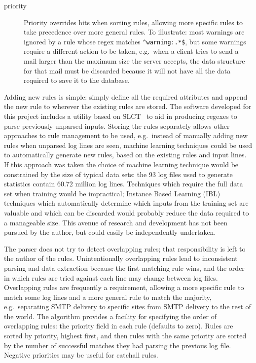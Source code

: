 \documentclass[draft]{svmult}
\newcommand{\numberOFlogFILES}[0]{%
    93%
}
\newcommand{\numberOFlogLINEShuman}[0]{%
    60.72 million%
}
\begin{document}
\begin{description}
    \item [priority] Priority overrides hits when sorting rules, allowing
        more specific rules to take precedence over more general rules.  To
        illustrate: most warnings are ignored by a rule whose regex matches
        \verb!^warning:.*$!, but some warnings require a different action
        to be taken, e.g.\ when a client tries to send a mail larger than
        the maximum size the server accepts, the data structure for that
        mail must be discarded because it will not have all the data
        required to save it to the database.

\end{description}

Adding new rules is simple: simply define all the required attributes and
append the new rule to wherever the existing rules are stored.  The
software developed for this project includes a utility based on
SLCT~\cite{slct-paper} to aid in producing regexes to parse previously
unparsed inputs.  Storing the rules separately allows other approaches to
rule management to be used, e.g.\ instead of manually adding new rules when
unparsed log lines are seen, machine learning techniques could be used to
automatically generate new rules, based on the existing rules and input
lines.  If this approach was taken the choice of machine learning technique
would be constrained by the size of typical data sets: the
\numberOFlogFILES{} log files used to generate statistics contain
\numberOFlogLINEShuman{} log lines.  Techniques which require the full data
set when training would be impractical; Instance Based Learning
(IBL)~\cite{instance-based-learning} techniques which automatically
determine which inputs from the training set are valuable and which can be
discarded would probably reduce the data required to a manageable size.
This avenue of research and development has not been pursued by the author,
but could easily be independently undertaken.

\label{overlapping rules}

The parser does not try to detect overlapping rules; that responsibility is
left to the author of the rules.  Unintentionally overlapping rules lead to
inconsistent parsing and data extraction because the first matching rule
wins, and the order in which rules are tried against each line may change
between log files.  Overlapping rules are frequently a requirement,
allowing a more specific rule to match some log lines and a more general
rule to match the majority, e.g.\ separating SMTP delivery to specific
sites from SMTP delivery to the rest of the world.  The algorithm provides
a facility for specifying the order of overlapping rules: the priority
field in each rule (defaults to zero).  Rules are sorted by priority,
highest first, and then rules with the same priority are sorted by the
number of successful matches they had parsing the previous log file.  Negative
priorities may be useful for catchall rules.
\end{document}
